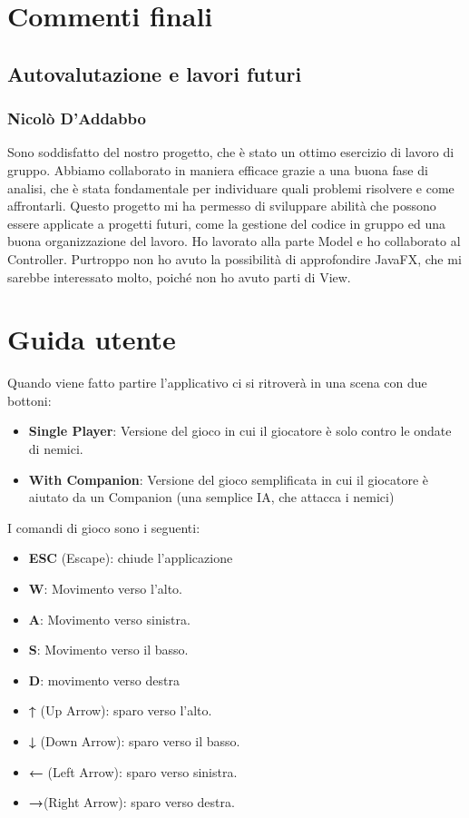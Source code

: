 \documentclass[a4paper,12pt]{report}
\begin{document}
\chapter{Commenti finali}

\section{Autovalutazione e lavori futuri}
\subsection*{Nicolò D'Addabbo}
Sono soddisfatto del nostro progetto, che è stato un ottimo esercizio di lavoro di gruppo. Abbiamo collaborato in maniera efficace grazie a una buona fase di analisi, che è stata fondamentale per individuare quali problemi risolvere e come affrontarli. Questo progetto mi ha permesso di sviluppare abilità che possono essere applicate a progetti futuri, come la gestione del codice in gruppo ed una buona organizzazione del lavoro.
Ho lavorato alla parte Model e ho collaborato al Controller. Purtroppo non ho avuto la possibilità di approfondire JavaFX, che mi sarebbe interessato molto, poiché non ho avuto parti di View.

\appendix
\chapter{Guida utente}

Quando viene fatto partire l'applicativo ci si ritroverà in una scena con due bottoni:
\begin{itemize}
    \item \textbf{Single Player}: Versione del gioco in cui il giocatore è solo contro le ondate di nemici.
    \item \textbf{With Companion}: Versione del gioco semplificata in cui il giocatore è aiutato da un Companion (una semplice IA, che attacca i nemici) 
\end{itemize}

I comandi di gioco sono i seguenti:
\begin{itemize}
    \item \textbf{ESC} (Escape): chiude l'applicazione
    \item \textbf{W}: Movimento verso l'alto.
    \item \textbf{A}: Movimento verso sinistra.
    \item \textbf{S}: Movimento verso il basso.
    \item \textbf{D}: movimento verso destra
    \item \textbf{↑} (Up Arrow): sparo verso l'alto.
    \item \textbf{↓} (Down Arrow): sparo verso il basso.
    \item \textbf{←} (Left Arrow): sparo verso sinistra.
    \item \textbf{→}(Right Arrow): sparo verso destra.
\end{itemize}



\end{document}

